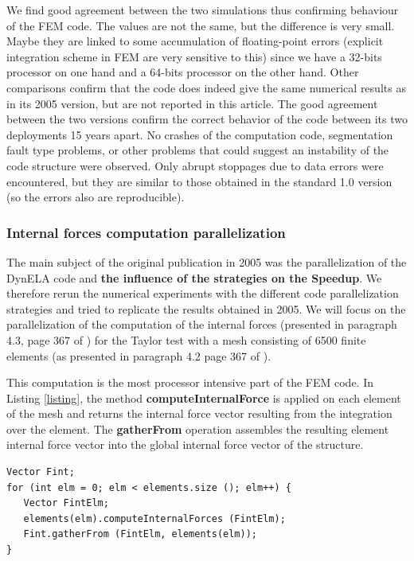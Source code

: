 We find good agreement between the two simulations thus confirming behaviour of the FEM code. The values are not the same, but the difference is very small. Maybe they are linked to some accumulation of floating-point errors (explicit integration scheme in FEM are very sensitive to this) since we have a 32-bits processor on one hand and a 64-bits processor on the other hand. Other comparisons confirm that the code does indeed give the same numerical results as in its 2005 version, but are not reported in this article. The good agreement between the two versions confirm the correct behavior of the code between its two deployments 15 years apart. No crashes of the computation code, segmentation fault type problems, or other problems that could suggest an instability of the code structure were observed. Only abrupt stoppages due to data errors were encountered, but they are similar to those obtained in the standard 1.0 version (so the errors also are reproducible).

\subsubsection{Internal forces computation parallelization}

The main subject of the original publication in 2005 was the parallelization of the DynELA code and \textbf{the influence of the strategies on the Speedup}. We therefore rerun the numerical experiments with the different code parallelization strategies and tried to replicate the results obtained in 2005. We will focus on the parallelization of the computation of the internal forces (presented in paragraph 4.3, page 367 of \cite{Pantale:2005}) for the Taylor test with a mesh consisting of 6500 finite elements (as presented in paragraph 4.2 page 367 of \cite{Pantale:2005}). 

This computation is the most processor intensive part of the FEM code. In Listing \ref{listing}, the method \textbf{computeInternalForce} is applied on each element of the mesh and returns the internal force vector resulting from the integration over the element. The \textbf{gatherFrom} operation assembles the resulting element internal force vector into the global internal force vector of the structure.

\begin{lstlisting}[label=listing,caption={Internal forces computation (standard version)},captionpos=b]
Vector Fint;
for (int elm = 0; elm < elements.size (); elm++) {
   Vector FintElm;
   elements(elm).computeInternalForces (FintElm);
   Fint.gatherFrom (FintElm, elements(elm));
}
\end{lstlisting}

